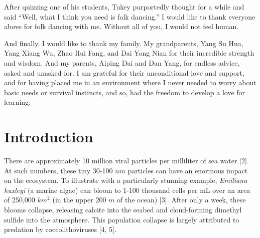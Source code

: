 \documentclass[12pt,twoside]{mitthesis-manusdown}
\begin{document}
After quizzing one of his students, Tukey purportedly thought for a
while and said ``Well, what I think you need is folk dancing.'' I would
like to thank everyone above for folk dancing with me. Without all of
you, I would not feel human.

And finally, I would like to thank my family. My grandparents, Yang Su
Hua, Yang Xiang Wu, Zhao Rui Fang, and Dai Yong Nian for their
incredible strength and wisdom. And my parents, Aiping Dai and Dan Yang,
for endless advice, asked and unasked for. I am grateful for their
unconditional love and support, and for having placed me in an
environment where I never needed to worry about basic needs or survival
instincts, and so, had the freedom to develop a love for learning.

\chapter{Introduction}\label{introduction}

There are approximately 10 million viral particles per milliliter of sea
water {[}2{]}. At such numbers, these tiny 30-100 \(nm\) particles can
have an enormous impact on the ecosystem. To illustrate with a
particularly stunning example, \emph{Emiliana huxleyi} (a marine algae)
can bloom to 1-100 thousand cells per mL over an area of 250,000
\(km^2\) (in the upper 200 \(m\) of the ocean) {[}3{]}. After only a
week, these blooms collapse, releasing calcite into the seabed and
cloud-forming dimethyl sulfide into the atmosphere. This population
collapse is largely attributed to predation by coccolithoviruses {[}4,
5{]}.
\end{document}
